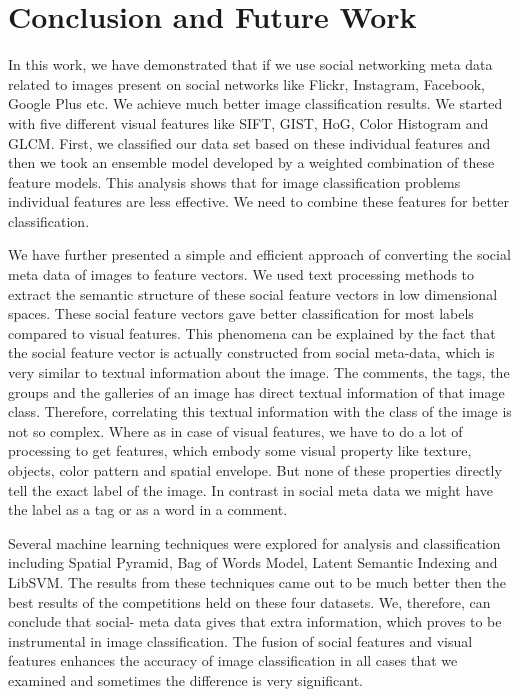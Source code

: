 
\chapter{Conclusion and Future Work} %

\label{conclusion} %


In this work, we have demonstrated that if we use social 
networking meta data related to images present on social networks 
like Flickr, Instagram, Facebook, Google Plus etc. We achieve much 
better image classification results. We started with five 
different visual features like SIFT, GIST, HoG, Color Histogram and 
GLCM. First, we classified our data set based on these individual 
features and then we took an ensemble model developed by a weighted 
combination of these feature models. This analysis shows that for image 
classification problems individual features are less effective. We 
need to combine these features for better classification.

We have further presented a simple and efficient approach of 
converting the social meta data of images to feature vectors. We used 
text processing methods to extract the semantic structure of 
these social feature vectors in low dimensional spaces. These  social 
feature vectors gave better classification for most labels 
compared to visual features. This phenomena can be explained by the 
fact that the social feature vector is actually constructed from 
social meta-data, which is very similar to textual information 
about the image. The comments, the tags, the groups and the 
galleries of an image has direct textual information of that 
image class. Therefore, correlating this textual information with 
the class of the image is not so complex. Where as in case of visual 
features, we have to do a lot of processing to get features, 
which embody some visual property like texture, objects, color 
pattern and spatial envelope. But none of these properties directly 
tell the exact label of the image. In contrast in social meta data we 
might have the label as a tag or as a word in a comment.

Several machine learning techniques were explored for analysis and 
classification including Spatial Pyramid, Bag of Words Model, Latent 
Semantic Indexing and LibSVM. The results from these techniques came 
out to be much better then the best results of the competitions held 
on these four datasets. We, therefore, can conclude that social-
meta data gives that extra information, which proves to be  
instrumental in image classification. The fusion of social features 
and visual features enhances the accuracy of image classification in
all cases that we examined and sometimes the difference is very 
significant.

